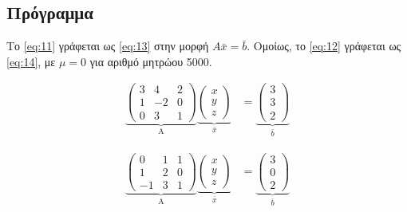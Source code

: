 \documentclass[12pt, fleqn, leqno]{extreport}
\begin{document}
\subsection{Πρόγραμμα}

Το \eqref{eq:11} γράφεται ως \eqref{eq:13} στην μορφή $A\bar{x}=\bar{b}$. Ομοίως, το \eqref{eq:12} γράφεται ως \eqref{eq:14},  με $\mu = 0$ για αριθμό μητρώου 5000.

\begin{equation}%
    \begin{aligned}
        \underbrace{
            \begin{pmatrix}
                3 & 4  & 2 \\
                1 & -2 & 0 \\
                0 & 3  & 1
            \end{pmatrix}
        }_\text{A}
        \underbrace{
            \begin{pmatrix}
                x \\
                y \\
                z
            \end{pmatrix}
        }_\text{$\bar{x}$}
         & =
        \underbrace{
            \begin{pmatrix}
                3 \\
                3 \\
                2
            \end{pmatrix}
        }_\text{$\bar{b}$}
    \end{aligned}\label{eq:13}
\end{equation}

\begin{equation}%
    \begin{aligned}
        \underbrace{
            \begin{pmatrix}
                0  & 1 & 1 \\
                1  & 2 & 0 \\
                -1 & 3 & 1
            \end{pmatrix}
        }_\text{A}
        \underbrace{
            \begin{pmatrix}
                x \\
                y \\
                z
            \end{pmatrix}
        }_\text{$\bar{x}$}
         & =
        \underbrace{
            \begin{pmatrix}
                3 \\
                0 \\
                2
            \end{pmatrix}
        }_\text{$\bar{b}$}
    \end{aligned}\label{eq:14}
\end{equation}
\end{document}
